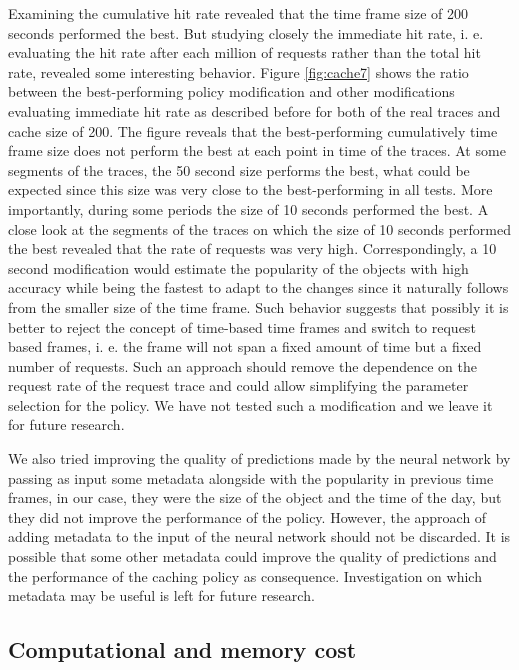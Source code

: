 Examining the cumulative hit rate revealed that the time frame size of 200 seconds performed the best. But studying closely the immediate hit rate, i. e. evaluating the hit rate after each million of requests rather than the total hit rate, revealed some interesting behavior. Figure \ref{fig:cache7} shows the ratio between the best-performing policy modification and other modifications evaluating immediate hit rate as described before for both of the real traces and cache size of 200. The figure reveals that the best-performing cumulatively time frame size does not perform the best at each point in time of the traces. At some segments of the traces, the 50 second size performs the best, what could be expected since this size was very close to the best-performing in all tests. More importantly, during some periods the size of 10 seconds performed the best. A close look at the segments of the traces on which the size of 10 seconds performed the best revealed that the rate of requests was very high. Correspondingly, a 10 second modification would estimate the popularity of the objects with high accuracy while being the fastest to adapt to the changes since it naturally follows from the smaller size of the time frame. Such behavior suggests that possibly it is better to reject the concept of time-based time frames and switch to request based frames, i. e. the frame will not span a fixed amount of time but a fixed number of requests. Such an approach should remove the dependence on the request rate of the request trace and could allow simplifying the parameter selection for the policy. We have not tested such a modification and we leave it for future research.

We also tried improving the quality of predictions made by the neural network by passing as input some metadata alongside with the popularity in previous time frames, in our case, they were the size of the object and the time of the day, but they did not improve the performance of the policy. However, the approach of adding metadata to the input of the neural network should not be discarded. It is possible that some other metadata could improve the quality of predictions and the performance of the caching policy as consequence. Investigation on which metadata may be useful is left for future research.

\subsection{Computational and memory cost} \label{comp_mem_cost}

